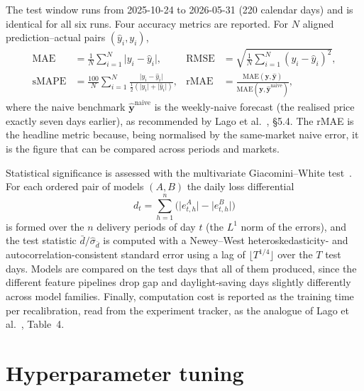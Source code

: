 The test window runs from 2025-10-24 to 2026-05-31 (220 calendar days) and is
identical for all six runs. Four accuracy metrics are reported. For $N$ aligned
prediction--actual pairs $(\hat{y}_i, y_i)$,
\begin{align}
  \mathrm{MAE}   &= \frac{1}{N}\sum_{i=1}^{N} \lvert y_i - \hat{y}_i \rvert,
  & \mathrm{RMSE} &= \sqrt{\frac{1}{N}\sum_{i=1}^{N} (y_i - \hat{y}_i)^2}, \\
  \mathrm{sMAPE} &= \frac{100}{N}\sum_{i=1}^{N} \frac{\lvert y_i - \hat{y}_i\rvert}{\tfrac{1}{2}(\lvert y_i\rvert + \lvert \hat{y}_i\rvert)},
  & \mathrm{rMAE} &= \frac{\mathrm{MAE}(\mathbf{y}, \hat{\mathbf{y}})}{\mathrm{MAE}(\mathbf{y}, \hat{\mathbf{y}}^{\text{naive}})},
\end{align}
where the naive benchmark $\hat{\mathbf{y}}^{\text{naive}}$ is the weekly-naive
forecast (the realised price exactly seven days earlier), as recommended by Lago
et al.~\cite{lago2021}, \S5.4. The rMAE is the headline metric because, being
normalised by the same-market naive error, it is the figure that can be compared
across periods and markets.

Statistical significance is assessed with the multivariate Giacomini--White
test~\cite{giacomini2006gw, lago2021}. For each ordered pair of models $(A,B)$
the daily loss differential
\begin{equation}
  d_t = \sum_{h=1}^{n} \bigl(\lvert e^{A}_{t,h}\rvert - \lvert e^{B}_{t,h}\rvert\bigr)
\end{equation}
is formed over the $n$ delivery periods of day $t$ (the $L^1$ norm of the
errors), and the test statistic $\bar{d}/\hat{\sigma}_{\bar d}$ is computed with
a Newey--West heteroskedasticity- and autocorrelation-consistent standard error
using a lag of $\lfloor T^{1/4}\rfloor$ over the $T$ test days. Models
are compared on the test days that all of them produced, since the different
feature pipelines drop gap and daylight-saving days slightly differently across
model families. Finally, computation cost is reported as the training time per
recalibration, read from the experiment tracker, as the analogue of Lago et
al.~\cite{lago2021}, Table~4.

\section{Hyperparameter tuning}
\label{sec:mm-tuning}

